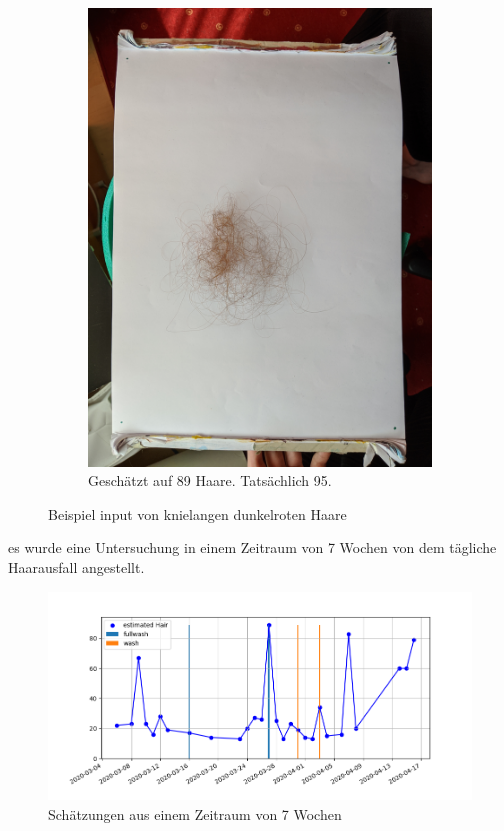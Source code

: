 \documentclass[german,a4paper,12pt]{llncs}
\begin{document}
\begin{figure}
\begin{subfigure}[b]{0.475\textwidth}
		\includegraphics[width=\textwidth]{testFig/M_IMG_20200327_132125_95.jpg}
		\caption[]{Geschätzt auf 89 Haare. Tatsächlich 95.}
		\label{img:tstM2}
	\end{subfigure}
	\caption[  ]
	{\small Beispiel input von knielangen dunkelroten Haare} 
	\label{img:tstM}
\end{figure}


es wurde eine Untersuchung in einem Zeitraum von 7 Wochen von dem tägliche Haarausfall angestellt. 
\begin{figure}
	\centering
	\includegraphics[width=1.2\textwidth]{fig64/plot.png}
	\caption[]{Schätzungen aus einem Zeitraum von 7 Wochen}
	\label{img:guess}
\end{figure} 
\end{document}
